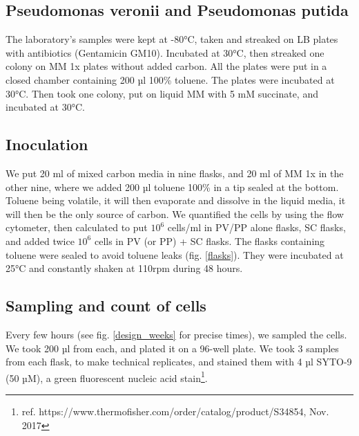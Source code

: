\documentclass[a4paper, 10pt, conference]{ieeeconf}   %
\begin{document}
\subsection{Pseudomonas veronii and Pseudomonas putida}
The laboratory's samples were kept at -80°C, taken and streaked on LB plates with antibiotics (Gentamicin GM10). Incubated at 30°C, then streaked one colony on MM 1x plates without added carbon. All the plates were put in a closed chamber containing 200 µl 100\% toluene. The plates were incubated at 30°C. Then took one colony, put on liquid MM with 5 mM succinate, and incubated at 30°C.

\subsection{Inoculation}
We put 20 ml of mixed carbon media in nine flasks, and 20 ml of MM 1x in the other nine, where we added 200 µl toluene 100\% in a tip sealed at the bottom. Toluene being volatile, it will then evaporate and dissolve in the liquid media, it will then be the only source of carbon. We quantified the cells by using the flow cytometer, then calculated to put $10^{6}$ cells/ml in PV/PP alone flasks, SC flasks, and added twice $10^{6}$ cells in PV (or PP) + SC flasks. The flasks containing toluene were sealed to avoid toluene leaks (fig. \ref{flasks}).
They were incubated at 25°C and constantly shaken at 110rpm during 48 hours.

\subsection{Sampling and count of cells}
Every few hours (see fig. \ref{design_weeks} for precise times), we sampled the cells. We took 200 µl from each, and plated it on a 96-well plate. We took 3 samples from each flask, to make technical replicates, and stained them with 4 µl SYTO-9 (50 µM), a  green fluorescent nucleic acid stain\footnote{ref. https://www.thermofisher.com/order/catalog/product/S34854, Nov. 2017}. 
\end{document}
